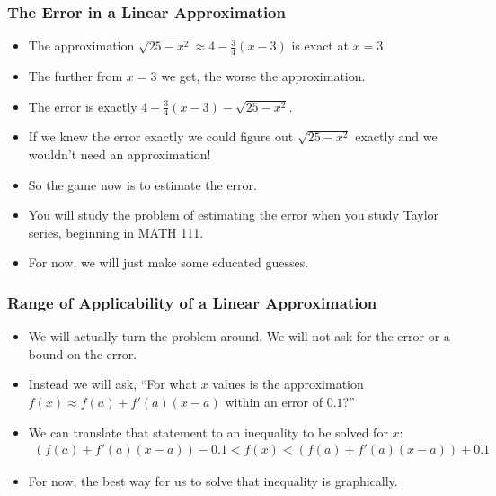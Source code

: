 \documentclass[serif,ignorenonframetext]{beamer}
\newcommand{\ds}{\displaystyle}
\begin{document}
\begin{frame}
  \frametitle{The Error in a Linear Approximation}
  \begin{itemize}[<+->]
  \item The approximation $\ds \sqrt{25-x^2} \approx 4-\frac{3}{4} (x-3)$ is
    exact at $x=3$.
  \item The further from $x=3$ we get, the worse the approximation.
  \item The error is exactly $\ds 4-\frac{3}{4} (x-3)-\sqrt{25-x^2}$.
  \item If we knew the error exactly we could figure out $\sqrt{25-x^2}$
    exactly and we wouldn't need an approximation!
  \item So the game now is to estimate the error.
  \item You will study the problem of estimating the error when you study
    Taylor series, beginning in MATH 111.
  \item For now, we will just make some educated guesses.
  \end{itemize}
\end{frame}

\begin{frame}
  \frametitle{Range of Applicability of a Linear Approximation}
  \begin{itemize}[<+->]
  \item We will actually turn the problem around.  We will not ask
    for the error or a bound on the error.
  \item Instead we will ask, ``For what $x$ values is the approximation
    $f(x) \approx f(a) + f'(a)(x-a)$ within an error of $0.1$?''
  \item We can translate that statement to an inequality to be solved
    for $x$:
    \begin{align*}
      \left(f(a) + f'(a)(x-a)\right) - 0.1 
      < f(x) 
      < \left(f(a) + f'(a)(x-a)\right) + 0.1
    \end{align*}
  \item For now, the best way for us to solve that inequality is
    graphically.
  \end{itemize}
\end{frame}
\end{document}
